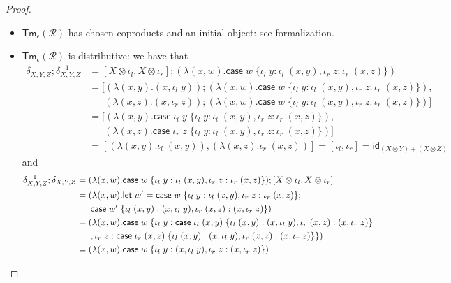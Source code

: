 \documentclass[acmsmall,screen,anonymous,review]{acmart}
\newcommand{\mc}[1]{\ensuremath{\mathcal{#1}}}
\newcommand{\ms}[1]{\ensuremath{\mathsf{#1}}}
\newcommand{\lto}{:}
\newcommand{\linl}[1]{\iota_l\;{#1}}
\newcommand{\linr}[1]{\iota_r\;{#1}}
\newcommand{\letexpr}[3]{\ensuremath{\ms{let}\;#1 = #2;\;#3}}
\newcommand{\caseexpr}[5]{\ms{case}\;#1\;\{\linl{#2} \lto #3, \linr{#4} \lto #5\}}
\begin{document}
\begin{proof}
\begin{itemize}
\begin{itemize}
\begin{align*}
        ; (\lambda ((y_2, y_1), y_3) . (y_2, (y_1, y_3)))
        ; (\lambda (z_2, (z_1, z_3)) . (z_2, (z_3, z_1)))
      \\
      &= \sigma_{A, B} \otimes C ; \alpha_{B, A, C} ; B \otimes \sigma_{A, C}
    \end{align*}
  \end{itemize}
  \item $\ms{Tm}_\epsilon(\mc{R})$ has chosen coproducts and an initial object: see formalization.
  \item $\ms{Tm}_\epsilon(\mc{R})$ is distributive: we have that
  \begin{align*}
    \delta_{X, Y, Z} ; \delta^{-1}_{X, Y, Z}
    &= [X \otimes \iota_l, X \otimes \iota_r] ; (\lambda (x, w) . 
      \caseexpr{w}{y}{\linl{(x, y)}}{z}{\linr{(x, z)}}) \\
    &= [
      (\lambda (x, y) . (x, \linl{y})) 
      ; (\lambda (x, w) . \caseexpr{w}{y}{\linl{(x, y)}}{z}{\linr{(x, z)}}), \\ & \quad\;\;
      (\lambda (x, z) . (x, \linr{z})) 
      ; (\lambda (x, w) . \caseexpr{w}{y}{\linl{(x, y)}}{z}{\linr{(x, z)}})
    ] \\
    &= [
      (\lambda (x, y) . \caseexpr{\linl{y}}{y}{\linl{(x, y)}}{z}{\linr{(x, z)}}), \\ & \quad\;\;
      (\lambda (x, z) . \caseexpr{\linr{z}}{y}{\linl{(x, y)}}{z}{\linr{(x, z)}})
    ] \\
    &= [
      (\lambda (x, y) . \linl{(x, y)}),
      (\lambda (x, z) . \linr{(x, z)})
    ] = [\iota_l, \iota_r] = \ms{id}_{(X \otimes Y) + (X \otimes Z)}
  \end{align*}
  and
  \begin{align*}
    \delta^{-1}_{X, Y, Z} ; \delta_{X, Y, Z}
    &= (\lambda (x, w) .  \caseexpr{w}{y}{\linl{(x, y)}}{z}{\linr{(x, z)}})
      ; [X \otimes \iota_l, X \otimes \iota_r] \\
    &= (\lambda (x, w) . \letexpr{w'}{\caseexpr{w}{y}{\linl{(x, y)}}{z}{\linr{(x, z)}}}{ 
      \\ & \quad\;\;
      \caseexpr{w'}{(x, y)}{(x, \linl{y})}{(x, z)}{(x, \linr{z})}}) \\
    &= (\lambda (x, w) . \caseexpr{w}
      {y}{\caseexpr{\linl{(x, y)}}{(x, y)}{(x, \linl{y})}{(x, z)}{(x, \linr{z})} \\ & \quad\;\;}
      {z}{\caseexpr{\linr{(x, z)}}{(x, y)}{(x, \linl{y})}{(x, z)}{(x, \linr{z})}}
    ) \\
    &= (\lambda (x, w) . \caseexpr{w}{y}{(x, \linl{y})}{z}{(x, \linr{z})}) \\

\end{align*}
\end{itemize}
\end{proof}
\end{document}
